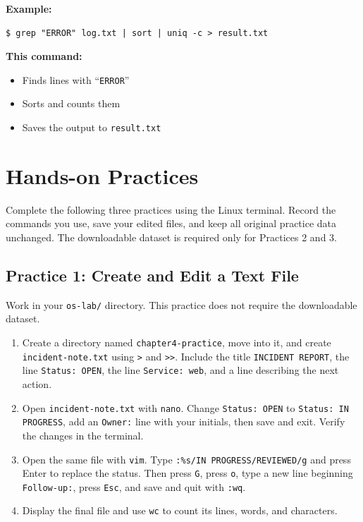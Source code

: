 \textbf{Example:}
\begin{lstlisting}[language=Terminal]
$ grep "ERROR" log.txt | sort | uniq -c > result.txt
\end{lstlisting}
\textbf{This command:}
\begin{itemize}
    \item Finds lines with ``\texttt{ERROR}''
    \item Sorts and counts them
    \item Saves the output to \texttt{result.txt}
\end{itemize}


\section{Hands-on Practices}
Complete the following three practices using the Linux terminal. Record the commands you use, save your edited files, and keep all original practice data unchanged. The downloadable dataset is required only for Practices 2 and 3.

\subsection{Practice 1: Create and Edit a Text File}
Work in your \texttt{os-lab/} directory. This practice does not require the downloadable dataset.
\begin{enumerate}
    \item Create a directory named \texttt{chapter4-practice}, move into it, and create \texttt{incident-note.txt} using \texttt{>} and \texttt{>>}. Include the title \texttt{INCIDENT REPORT}, the line \texttt{Status: OPEN}, the line \texttt{Service: web}, and a line describing the next action.
    \item Open \texttt{incident-note.txt} with \texttt{nano}. Change \texttt{Status: OPEN} to \texttt{Status: IN PROGRESS}, add an \texttt{Owner:} line with your initials, then save and exit. Verify the changes in the terminal.
    \item Open the same file with \texttt{vim}. Type \texttt{:\%s/IN PROGRESS/REVIEWED/g} and press Enter to replace the status. Then press \texttt{G}, press \texttt{o}, type a new line beginning \texttt{Follow-up:}, press \texttt{Esc}, and save and quit with \texttt{:wq}.
    \item Display the final file and use \texttt{wc} to count its lines, words, and characters.
\end{enumerate}

